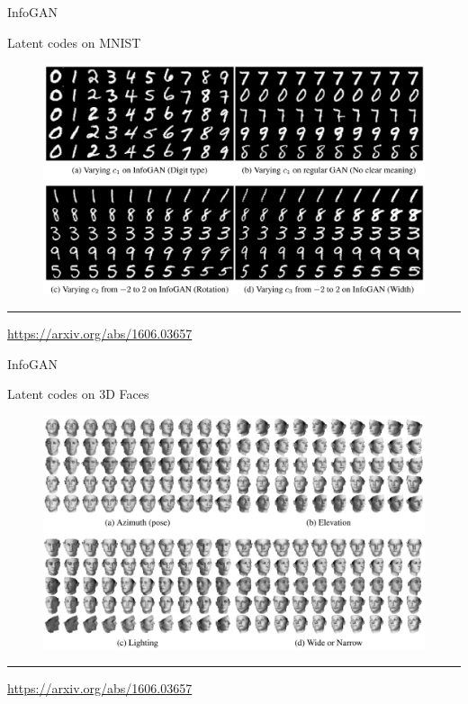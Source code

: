 \documentclass{beamer}
\begin{document}
\begin{frame}{InfoGAN}
	\begin{block}{Latent codes on MNIST}
		\begin{figure}
			\centering
			\includegraphics[width=\linewidth]{figs/infogan_mnist.png}
		\end{figure}
	\end{block}
	\vfill
	\hrule\medskip
	{\scriptsize \href{https://arxiv.org/abs/1606.03657}{https://arxiv.org/abs/1606.03657}}
\end{frame}
\begin{frame}{InfoGAN}
	\begin{block}{Latent codes on 3D Faces}
		\begin{figure}
			\centering
			\includegraphics[width=\linewidth]{figs/infogan_faces.png}
		\end{figure}
	\end{block}
\vfill
\hrule\medskip
{\scriptsize \href{https://arxiv.org/abs/1606.03657}{https://arxiv.org/abs/1606.03657}}
\end{frame}
\end{document}
